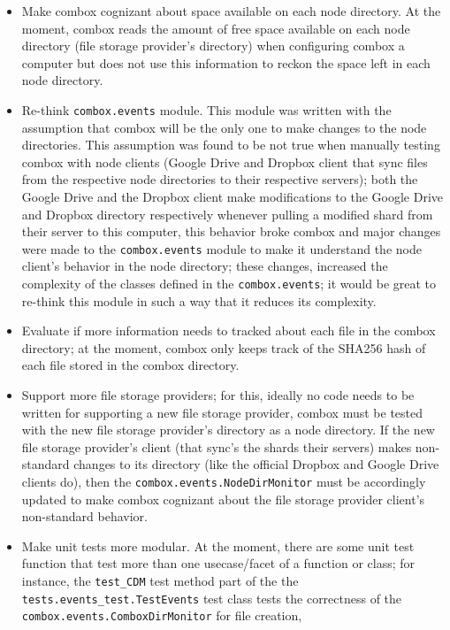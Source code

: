 \begin{itemize}
\item Make combox cognizant about space available on each node
  directory. At the moment, combox reads the amount of free space
  available on each node directory (file storage provider's directory)
  when configuring combox a computer but does not use this information
  to reckon the space left in each node directory.
\item Re-think \verb+combox.events+ module. This module was written
  with the assumption that combox will be the only one to make changes
  to the node directories. This assumption was found to be not true
  when manually testing combox with node clients (Google Drive and
  Dropbox client that sync files from the respective node directories
  to their respective servers); both the Google Drive and the Dropbox
  client make modifications to the Google Drive and Dropbox directory
  respectively whenever pulling a modified shard from their server to
  this computer, this behavior broke combox and major changes were
  made to the \verb+combox.events+ module to make it understand the
  node client's behavior in the node directory; these changes,
  increased the complexity of the classes defined in the
  \verb+combox.events+; it would be great to re-think this module in
  such a way that it reduces its complexity.
\item Evaluate if more information needs to tracked about each file in
  the combox directory; at the moment, combox only keeps track of the
  SHA256 hash of each file stored in the combox directory.
\item Support more file storage providers; for this, ideally no code
  needs to be written for supporting a new file storage provider,
  combox must be tested with the new file storage provider's directory
  as a node directory. If the new file storage provider's client (that
  sync's the shards their servers) makes non-standard changes to its
  directory (like the official Dropbox and Google Drive clients do),
  then the \verb+combox.events.NodeDirMonitor+ must be accordingly
  updated to make combox cognizant about the file storage provider
  client's non-standard behavior.
\item Make unit tests more modular. At the moment, there are some unit
  test function that test more than one usecase/facet of a function or
  class; for instance, the \verb+test_CDM+ test method part of the the
  \verb+tests.events_test.TestEvents+ test class tests the correctness
  of the \verb+combox.events.ComboxDirMonitor+ for file creation,

\end{itemize}
